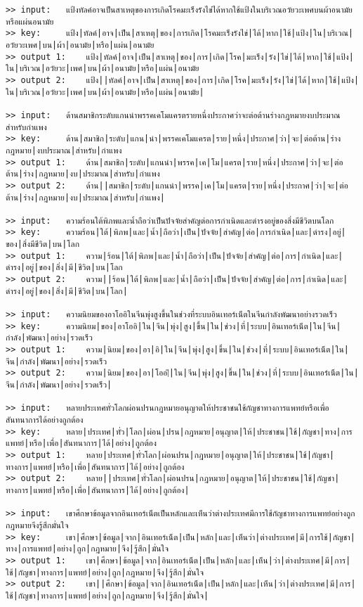 \documentclass[11pt]{article}
\begin{document}
\begin{Verbatim}[commandchars=\\\{\}]
>> input:	แป้งทัลค์อาจเป็นสาเหตุของการเกิดโรคมะเร็งรังไข่ได้หากใช้แป้งในบริเวณอวัยวะเพศบนผ้าอนามัยหรือแผ่นอนามัย
>> key:		แป้ง|ทัลค์|อาจ|เป็น|สาเหตุ|ของ|การเกิด|โรคมะเร็งรังไข่|ได้|หาก|ใช้|แป้ง|ใน|บริเวณ|อวัยวะเพศ|บน|ผ้า|อนามัย|หรือ|แผ่น|อนามัย
>> output 1:	แป้ง|ทัลค์|อาจ|เป็น|สาเหตุ|ของ|การ|เกิด|โรค|มะเร็ง|รัง|ไข่|ได้|หาก|ใช้|แป้ง|ใน|บริเวณ|อวัยวะ|เพศ|บน|ผ้า|อนามัย|หรือ|แผ่น|อนามัย
>> output 2:	แป้ง||ทัลค์|อาจ|เป็น|สาเหตุ|ของ|การ|เกิด|โรค|มะเร็ง|รัง|ไข่|ได้|หาก|ใช้|แป้ง|ใน|บริเวณ|อวัยวะ|เพศ|บน|ผ้า|อนามัย|หรือ|แผ่น|อนามัย|

>> input:	ด้านสมาชิกระดับแกนนำพรรคเคโมแครตรายหนึ่งประกาศว่าจะต่อต้านร่างกฎหมายงบประมาณสำหรับกำแพง
>> key:		ด้าน|สมาชิก|ระดับ|แกน|นำ|พรรคเคโมแครต|ราย|หนึ่ง|ประกาศ|ว่า|จะ|ต่อต้าน|ร่างกฎหมาย|งบประมาณ|สำหรับ|กำแพง
>> output 1:	ด้าน|สมาชิก|ระดับ|แกนนำ|พรรค|เค|โม|แครต|ราย|หนึ่ง|ประกาศ|ว่า|จะ|ต่อต้าน|ร่าง|กฎหมาย|งบ|ประมาณ|สำหรับ|กำแพง
>> output 2:	ด้าน||สมาชิก|ระดับ|แกนนำ|พรรค|เค|โม|แครต|ราย|หนึ่ง|ประกาศ|ว่า|จะ|ต่อต้าน|ร่าง|กฎหมาย|งบ|ประมาณ|สำหรับ|กำแพง|

>> input:	ความร้อนใต้พิภพและน้ำถือว่าเป็นปัจจัยสำคัญต่อการกำเนิดและดำรงอยู่ของสิ่งมีชีวิตบนโลก
>> key:		ความร้อน|ใต้|พิภพ|และ|น้ำ|ถือว่า|เป็น|ปัจจัย|สำคัญ|ต่อ|การกำเนิด|และ|ดำรง|อยู่|ของ|สิ่งมีชีวิต|บน|โลก
>> output 1:	ความ|ร้อน|ใต้|พิภพ|และ|น้ำ|ถือว่า|เป็น|ปัจจัย|สำคัญ|ต่อ|การ|กำเนิด|และ|ดำรง|อยู่|ของ|สิ่ง|มี|ชีวิต|บน|โลก
>> output 2:	ความ||ร้อน|ใต้|พิภพ|และ|น้ำ|ถือว่า|เป็น|ปัจจัย|สำคัญ|ต่อ|การ|กำเนิด|และ|ดำรง|อยู่|ของ|สิ่ง|มี|ชีวิต|บน|โลก|

>> input:	ความนิยมของอาโออิในจีนพุ่งสูงขึ้นในช่วงที่ระบบอินเทอร์เน็ตในจีนกำลังพัฒนาอย่างรวดเร็ว
>> key:		ความนิยม|ของ|อาโออิ|ใน|จีน|พุ่ง|สูง|ขึ้น|ใน|ช่วง|ที่|ระบบ|อินเทอร์เน็ต|ใน|จีน|กำลัง|พัฒนา|อย่าง|รวดเร็ว
>> output 1:	ความ|นิยม|ของ|อา|อิ|ใน|จีน|พุ่ง|สูง|ขึ้น|ใน|ช่วง|ที่|ระบบ|อินเทอร์เน็ต|ใน|จีน|กำลัง|พัฒนา|อย่าง|รวดเร็ว
>> output 2:	ความ|นิยม|ของ|อา|โออ|ิ|ใน|จีน|พุ่ง|สูง|ขึ้น|ใน|ช่วง|ที่|ระบบ|อินเทอร์เน็ต|ใน|จีน|กำลัง|พัฒนา|อย่าง|รวดเร็ว|

>> input:	หลายประเทศทั่วโลกผ่อนปรนกฎหมายอนุญาตให้ประชาชนใช้กัญชาทางการแพทย์หรือเพื่อสันทนาการได้อย่างถูกต้อง
>> key:		หลาย|ประเทศ|ทั่ว|โลก|ผ่อน|ปรน|กฎหมาย|อนุญาต|ให้|ประชาชน|ใช้|กัญชา|ทาง|การแพทย์|หรือ|เพื่อ|สันทนาการ|ได้|อย่าง|ถูกต้อง
>> output 1:	หลาย|ประเทศ|ทั่วโลก|ผ่อนปรน|กฎหมาย|อนุญาต|ให้|ประชาชน|ใช้|กัญชา|ทางการ|แพทย์|หรือ|เพื่อ|สันทนาการ|ได้|อย่าง|ถูกต้อง
>> output 2:	หลาย||ประเทศ|ทั่วโลก|ผ่อนปรน|กฎหมาย|อนุญาต|ให้|ประชาชน|ใช้|กัญชา|ทางการ|แพทย์|หรือ|เพื่อ|สันทนาการ|ได้|อย่าง|ถูกต้อง|

>> input:	เขาศึกษาข้อมูลจากอินเทอร์เน็ตเป็นหลักและเห็นว่าต่างประเทศมีการใช้กัญชาทางการแพทย์อย่างถูกกฎหมายจึงรู้สึกมั่นใจ
>> key:		เขา|ศึกษา|ข้อมูล|จาก|อินเทอร์เน็ต|เป็น|หลัก|และ|เห็นว่า|ต่างประเทศ|มี|การใช้|กัญชา|ทาง|การแพทย์|อย่าง|ถูก|กฎหมาย|จึง|รู้สึก|มั่นใจ
>> output 1:	เขา|ศึกษา|ข้อมูล|จาก|อินเทอร์เน็ต|เป็น|หลัก|และ|เห็น|ว่า|ต่างประเทศ|มี|การ|ใช้|กัญชา|ทางการ|แพทย์|อย่าง|ถูก|กฎหมาย|จึง|รู้สึก|มั่นใจ
>> output 2:	เขา||ศึกษา|ข้อมูล|จาก|อินเทอร์เน็ต|เป็น|หลัก|และ|เห็น|ว่า|ต่างประเทศ|มี|การ|ใช้|กัญชา|ทางการ|แพทย์|อย่าง|ถูก|กฎหมาย|จึง|รู้สึก|มั่นใจ|


\end{Verbatim}
\end{document}
